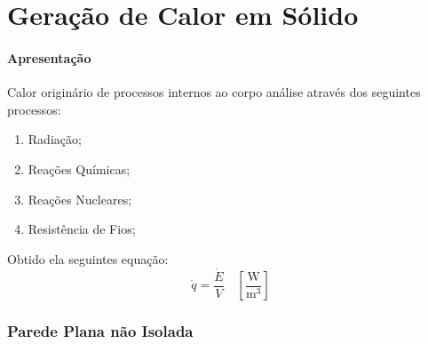 \documentclass{article}
\begin{document}
    \section{Geração de Calor em Sólido}
        \paragraph{Apresentação}Calor originário de processos internos ao corpo análise através dos seguintes processos:
            \begin{enumerate}[noitemsep]
                \item Radiação;
                \item Reações Químicas;
                \item Reações Nucleares;
                \item Resistência de Fios;
            \end{enumerate}
        Obtido ela seguintes equação:
            \begin{equation}
                \boxed{
                    \dot{q} = 
                    \frac{\dot{E}}{V}
                    \quad
                    \left[
                        \frac{\text{W}}{\text{m}^{3}}
                    \right]
                }
            \end{equation}

        \subsubsection{Parede Plana não Isolada}
\end{document}
